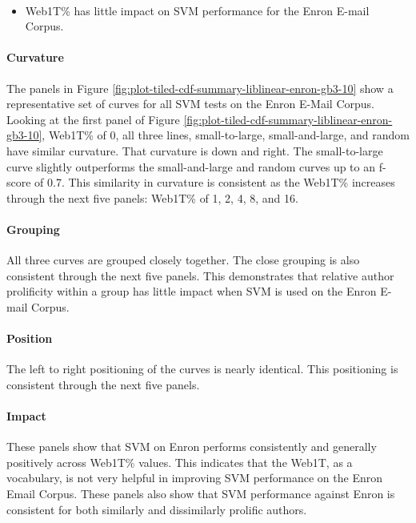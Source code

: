 	\paragraph*{}  
	\begin{itemize}
	\item Web1T\% has little impact on SVM performance for the Enron E-mail Corpus.
	\end{itemize}
	\paragraph*{Curvature}The panels in Figure \ref{fig:plot-tiled-cdf-summary-liblinear-enron-gb3-10} show a representative set of curves for all SVM tests on the Enron E-Mail Corpus.  Looking at the first panel of Figure \ref{fig:plot-tiled-cdf-summary-liblinear-enron-gb3-10}, Web1T\% of 0, all three lines, small-to-large, small-and-large, and random have similar curvature.  That curvature is down and right. The small-to-large curve slightly outperforms the small-and-large and random curves up to an f-score of 0.7. This similarity in curvature is consistent as the Web1T\% increases through the next five panels: Web1T\% of 1, 2, 4, 8, and 16. 
	\paragraph*{Grouping}All three curves are grouped closely together.  The close grouping is also consistent through the next five panels. This demonstrates that relative author prolificity within a group has little impact when SVM is used on the Enron E-mail Corpus.
	\paragraph*{Position}The left to right positioning of the curves is nearly identical.  This positioning is consistent through the next five panels.
	\paragraph*{Impact} These panels show that SVM on Enron performs consistently and generally positively across Web1T\% values.  This indicates that the Web1T, as a vocabulary, is not very helpful in improving SVM performance on the Enron Email Corpus. These panels also show that SVM performance against Enron is consistent for both similarly and dissimilarly prolific authors.
	
